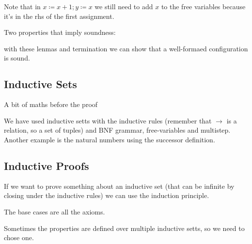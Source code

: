 Note that in $ x \coloneq x + 1; y \coloneq x $ we still need to add $ x $ to the free variables because it's in the rhs of the first assignment. 


Two properties that imply soundness:



with these lenmas and termination we can show that a well-formaed configuration is sound.

\subsection{Inductive Sets}
A bit of maths before the proof


We have used inductive setts with the inductive rules (remember that $ \to $ is a relation, so a set of tuples) and BNF grammar, free-variables and multistep. Another example is the natural numbers using the successor definition.

\subsection{Inductive Proofs}
If we want to prove something about an inductive set (that can be infinite by closing under the inductive rules) we can use the induction principle.

The base cases are all the axioms.

Sometimes the properties are defined over multiple inductive setts, so we need to chose one. 
% 
